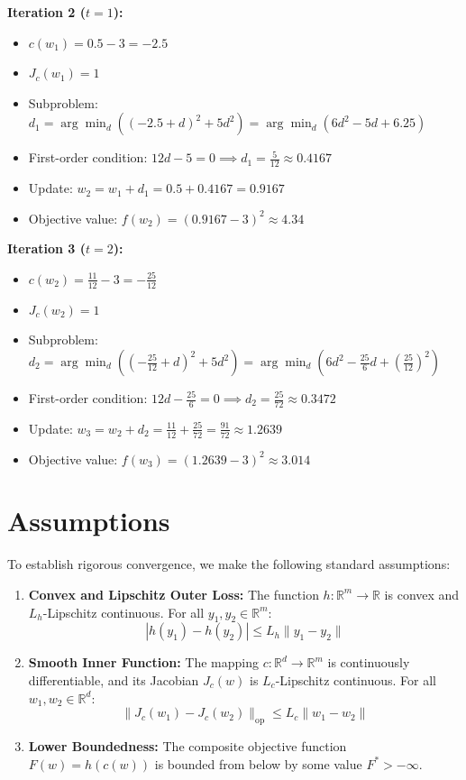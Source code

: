\documentclass[11pt]{article}
\begin{document}
\textbf{Iteration 2 ($t=1$):}
\begin{itemize}
    \item $c(w_1) = 0.5 - 3 = -2.5$
    \item $J_c(w_1) = 1$
    \item Subproblem: $d_1 = \arg\min_d \left( (-2.5 + d)^2 + 5d^2 \right) = \arg\min_d \left( 6d^2 - 5d + 6.25 \right)$
    \item First-order condition: $12d - 5 = 0 \implies d_1 = \frac{5}{12} \approx 0.4167$
    \item Update: $w_2 = w_1 + d_1 = 0.5 + 0.4167 = 0.9167$
    \item Objective value: $f(w_2) = (0.9167 - 3)^2 \approx 4.34$
\end{itemize}

\textbf{Iteration 3 ($t=2$):}
\begin{itemize}
    \item $c(w_2) = \frac{11}{12} - 3 = -\frac{25}{12}$
    \item $J_c(w_2) = 1$
    \item Subproblem: $d_2 = \arg\min_d \left( \left(-\frac{25}{12} + d\right)^2 + 5d^2 \right) = \arg\min_d \left( 6d^2 - \frac{25}{6}d + \left(\frac{25}{12}\right)^2 \right)$
    \item First-order condition: $12d - \frac{25}{6} = 0 \implies d_2 = \frac{25}{72} \approx 0.3472$
    \item Update: $w_3 = w_2 + d_2 = \frac{11}{12} + \frac{25}{72} = \frac{91}{72} \approx 1.2639$
    \item Objective value: $f(w_3) = (1.2639 - 3)^2 \approx 3.014$
\end{itemize}

\section*{Assumptions}
To establish rigorous convergence, we make the following standard assumptions:
\begin{enumerate}
    \item \textbf{Convex and Lipschitz Outer Loss:} The function $h: \mathbb{R}^m \to \mathbb{R}$ is convex and $L_h$-Lipschitz continuous. For all $y_1, y_2 \in \mathbb{R}^m$:
    $$|h(y_1) - h(y_2)| \leq L_h \|y_1 - y_2\|$$
    \item \textbf{Smooth Inner Function:} The mapping $c: \mathbb{R}^d \to \mathbb{R}^m$ is continuously differentiable, and its Jacobian $J_c(w)$ is $L_c$-Lipschitz continuous. For all $w_1, w_2 \in \mathbb{R}^d$:
    $$\|J_c(w_1) - J_c(w_2)\|_{\text{op}} \leq L_c \|w_1 - w_2\|$$
    \item \textbf{Lower Boundedness:} The composite objective function $F(w) = h(c(w))$ is bounded from below by some value $F^* > -\infty$.
\end{enumerate}
\end{document}
